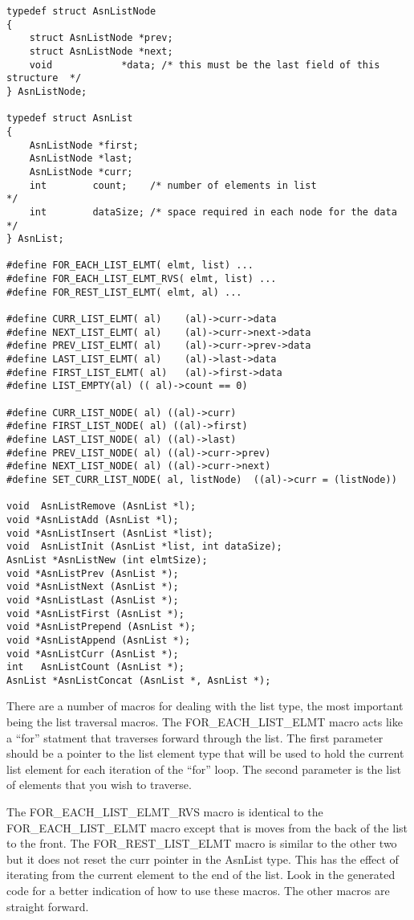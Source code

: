 \begin{small}
\begin{verbatim}
typedef struct AsnListNode
{
    struct AsnListNode *prev;
    struct AsnListNode *next;
    void            *data; /* this must be the last field of this structure  */
} AsnListNode;

typedef struct AsnList
{
    AsnListNode *first;
    AsnListNode *last;
    AsnListNode *curr;
    int        count;    /* number of elements in list               */
    int        dataSize; /* space required in each node for the data */
} AsnList;

#define FOR_EACH_LIST_ELMT( elmt, list) ...
#define FOR_EACH_LIST_ELMT_RVS( elmt, list) ...
#define FOR_REST_LIST_ELMT( elmt, al) ...

#define CURR_LIST_ELMT( al)    (al)->curr->data
#define NEXT_LIST_ELMT( al)    (al)->curr->next->data
#define PREV_LIST_ELMT( al)    (al)->curr->prev->data
#define LAST_LIST_ELMT( al)    (al)->last->data
#define FIRST_LIST_ELMT( al)   (al)->first->data
#define LIST_EMPTY(al) (( al)->count == 0)

#define CURR_LIST_NODE( al) ((al)->curr)
#define FIRST_LIST_NODE( al) ((al)->first)
#define LAST_LIST_NODE( al) ((al)->last)
#define PREV_LIST_NODE( al) ((al)->curr->prev)
#define NEXT_LIST_NODE( al) ((al)->curr->next)
#define SET_CURR_LIST_NODE( al, listNode)  ((al)->curr = (listNode))

void  AsnListRemove (AsnList *l);
void *AsnListAdd (AsnList *l);
void *AsnListInsert (AsnList *list);
void  AsnListInit (AsnList *list, int dataSize);
AsnList *AsnListNew (int elmtSize);
void *AsnListPrev (AsnList *);
void *AsnListNext (AsnList *);
void *AsnListLast (AsnList *);
void *AsnListFirst (AsnList *);
void *AsnListPrepend (AsnList *);
void *AsnListAppend (AsnList *);
void *AsnListCurr (AsnList *);
int   AsnListCount (AsnList *);
AsnList *AsnListConcat (AsnList *, AsnList *);
\end{verbatim}
\end{small}

There are a number of macros for dealing with the list type, the
most important being the list traversal macros.  The
{\C FOR\_EACH\_LIST\_ELMT} macro acts like a ``for'' statment that
traverses forward through the list.  The first parameter should be a
pointer to the list element type that will be used to hold the current list
element for each iteration of the ``for'' loop.  The second parameter is
the list of elements that you wish to traverse.

The {\C FOR\_EACH\_LIST\_ELMT\_RVS} macro is identical to the
{\C FOR\_EACH\_LIST\_ELMT} macro except that is moves from the back of
the list to the front.   The {\C FOR\_REST\_LIST\_ELMT} macro is
similar to the other two but it does not reset the {\C curr} pointer
in the {\C AsnList} type.  This has the effect of iterating from the
current element to the end of the list.   Look in the generated code
for a better indication of how to use these macros.  The other macros
are straight forward.


